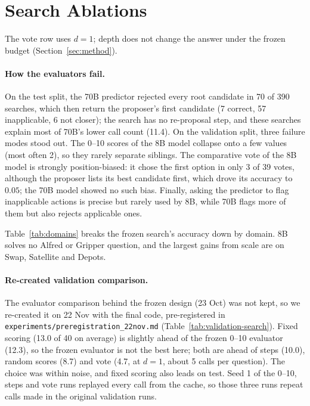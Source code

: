 \section{Search Ablations}
\label{app:ablations}



The vote row uses $d{=}1$; depth does not change the answer under the frozen budget (Section~\ref{sec:method}).

\paragraph{How the evaluators fail.} On the test split, the 70B predictor rejected every root candidate in 70 of 390 searches, which then return the proposer's first candidate (7 correct, 57 inapplicable, 6 not closer); the search has no re-proposal step, and these searches explain most of 70B's lower call count (11.4).
On the validation split, three failure modes stood out. The 0--10 scores of the 8B model collapse
onto a few values (most often 2), so they rarely separate siblings. The comparative vote of the 8B
model is strongly position-biased: it chose the first option in only 3 of 39 votes, although the
proposer lists its best candidate first, which drove its accuracy to $0.05$; the 70B model showed no
such bias. Finally, asking the predictor to flag inapplicable actions is precise but rarely used by
8B, while 70B flags more of them but also rejects applicable ones.

Table~\ref{tab:domains} breaks the frozen search's accuracy down by domain. 8B solves no Alfred or Gripper question, and the largest gains from scale are on Swap, Satellite and Depots.



\paragraph{Re-created validation comparison.} The evaluator comparison behind the frozen design (23 Oct) was not kept, so we re-created it on 22 Nov with the final code, pre-registered in \texttt{experiments/preregistration\_22nov.md} (Table~\ref{tab:validation-search}). Fixed scoring (13.0 of 40 on average) is slightly ahead of the frozen 0--10 evaluator (12.3), so the frozen evaluator is not the best here; both are ahead of steps (10.0), random scores (8.7) and vote (4.7, at $d{=}1$, about 5 calls per question). The choice was within noise, and fixed scoring also leads on test. Seed 1 of the 0--10, steps and vote runs replayed every call from the cache, so those three runs repeat calls made in the original validation runs.


